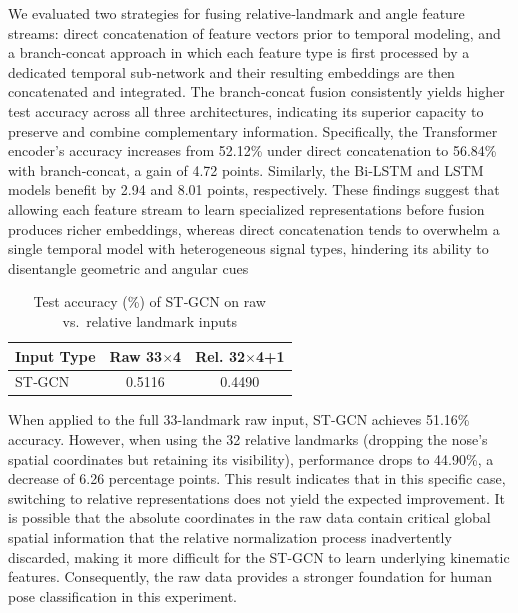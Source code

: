 \documentclass[runningheads]{llncs}
\begin{document}
We evaluated two strategies for fusing relative‐landmark and angle feature streams: direct concatenation of feature vectors prior to temporal modeling, and a branch‐concat approach in which each feature type is first processed by a dedicated temporal sub‐network and their resulting embeddings are then concatenated and integrated. The branch‐concat fusion consistently yields higher test accuracy across all three architectures, indicating its superior capacity to preserve and combine complementary information. Specifically, the Transformer encoder’s accuracy increases from 52.12\% under direct concatenation to 56.84\% with branch‐concat, a gain of 4.72 points. Similarly, the Bi‐LSTM and LSTM models benefit by 2.94 and 8.01 points, respectively. These findings suggest that allowing each feature stream to learn specialized representations before fusion produces richer embeddings, whereas direct concatenation tends to overwhelm a single temporal model with heterogeneous signal types, hindering its ability to disentangle geometric and angular cues

\begin{table}[!h]
\centering
\caption{Test accuracy (\%) of ST‐GCN on raw vs.\ relative landmark inputs}
\label{tab:stgcn-results}
\begin{tabular}{l c c}
\hline
\textbf{Input Type} & \textbf{Raw 33$\times$4} & \textbf{Rel. 32$\times$4+1} \\
\hline
ST‐GCN              & 0.5116                   & 0.4490                     \\
\hline
\end{tabular}
\end{table}

When applied to the full 33-landmark raw input, ST-GCN achieves 51.16\% accuracy. However, when using the 32 relative landmarks (dropping the nose’s spatial coordinates but retaining its visibility), performance drops to 44.90\%, a decrease of 6.26 percentage points. This result indicates that in this specific case, switching to relative representations does not yield the expected improvement. It is possible that the absolute coordinates in the raw data contain critical global spatial information that the relative normalization process inadvertently discarded, making it more difficult for the ST-GCN to learn underlying kinematic features. Consequently, the raw data provides a stronger foundation for human pose classification in this experiment.
\end{document}
